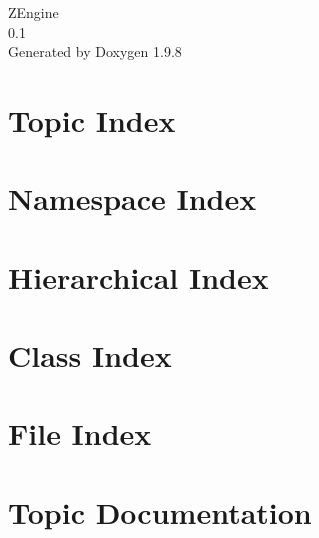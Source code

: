 \documentclass[twoside]{book}
\newcommand{\+}{\discretionary{\mbox{\scriptsize$\hookleftarrow$}}{}{}}
\newcommand{\clearemptydoublepage}{%
    \newpage{\pagestyle{empty}\cleardoublepage}%
  }
\begin{document}
  \raggedbottom
    \hypersetup{pageanchor=false,
                bookmarksnumbered=true,
                pdfencoding=unicode
               }
  \begin{titlepage}
  \vspace*{7cm}
  \begin{center}%
  {\Large ZEngine}\\
  [1ex]\large 0.\+1 \\
  \vspace*{1cm}
  {\large Generated by Doxygen 1.9.8}\\
  \end{center}
  \end{titlepage}
  \clearemptydoublepage
  \tableofcontents
  \clearemptydoublepage
  \hypersetup{pageanchor=true}


\chapter{Topic Index}

\chapter{Namespace Index}

\chapter{Hierarchical Index}

\chapter{Class Index}

\chapter{File Index}

\chapter{Topic Documentation}













\end{document}
